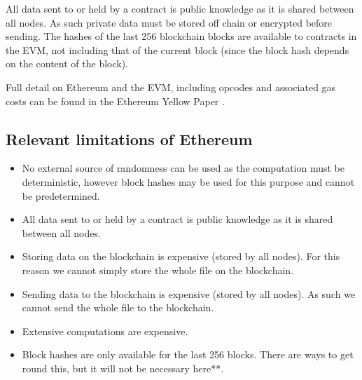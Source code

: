 \documentclass[12pt,a4paper,twoside,openright]{report}
\begin{document}
All data sent to or held by a contract is public knowledge as it is shared between all nodes.
As such private data must be stored off chain or encrypted before sending.
The hashes of the last 256 blockchain blocks are available to contracts in the EVM, not including that of the current block (since the block hash depends on the content of the block).

Full detail on Ethereum and the EVM, including opcodes and associated gas costs can be found in the Ethereum Yellow Paper \cite{eth-yellowpaper}.

\subsection{Relevant limitations of Ethereum}

\begin{itemize}
\item No external source of randomness can be used as the computation must be deterministic,
however block hashes may be used for this purpose and cannot be predetermined.

\item All data sent to or held by a contract is public knowledge as it is shared between all nodes.

\item Storing data on the blockchain is expensive (stored by all nodes).
For this reason we cannot simply store the whole file on the blockchain.

\item Sending data to the blockchain is expensive (stored by all nodes).
As such we cannot send the whole file to the blockchain.

\item Extensive computations are expensive.

\item Block hashes are only available for the last 256 blocks.
There are ways to get round this, but it will not be necessary here**.
\end{itemize}





%
%
%
\end{document}
